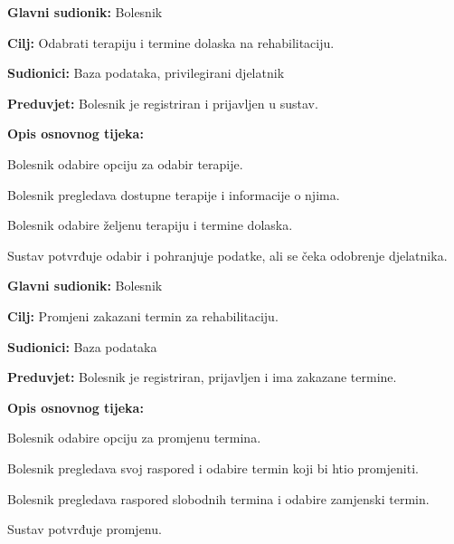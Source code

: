 \vspace{1em} %
\noindent{}
\begin{packed_item}
	\item \textbf{Glavni sudionik:} Bolesnik
	\item \textbf{Cilj:} Odabrati terapiju i termine dolaska na rehabilitaciju.
	\item \textbf{Sudionici:} Baza podataka, privilegirani djelatnik
	\item \textbf{Preduvjet:} Bolesnik je registriran i prijavljen u sustav.
	\item \textbf{Opis osnovnog tijeka:}
	\begin{packed_enum}
		\item Bolesnik odabire opciju za odabir terapije.
		\item Bolesnik pregledava dostupne terapije i informacije o njima.
		\item Bolesnik odabire željenu terapiju i termine dolaska.
		\item Sustav potvrđuje odabir i pohranjuje podatke, ali se čeka odobrenje djelatnika.
	\end{packed_enum}
\end{packed_item}

\vspace{1em} %
\noindent{}
\begin{packed_item}
	\item \textbf{Glavni sudionik:} Bolesnik
	\item \textbf{Cilj:} Promjeni zakazani termin za rehabilitaciju.
	\item \textbf{Sudionici:} Baza podataka
	\item \textbf{Preduvjet:} Bolesnik je registriran, prijavljen i ima zakazane termine.
	\item \textbf{Opis osnovnog tijeka:}
	\begin{packed_enum}
		\item Bolesnik odabire opciju za promjenu termina.
		\item Bolesnik pregledava svoj raspored i odabire termin koji bi htio promjeniti.
		\item Bolesnik pregledava raspored slobodnih termina i odabire zamjenski termin.
		\item Sustav potvrđuje promjenu.
	\end{packed_enum}
\end{packed_item}


